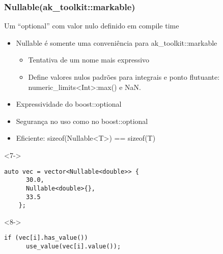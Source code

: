 \documentclass[t]{beamer}
\begin{document}
\begin{frame}[fragile]
  \frametitle{Nullable(ak\_toolkit::markable)}
  Um ``optional'' com valor nulo definido em compile time
  \begin{itemize}
    \item<1->{Nullable é somente uma conveniência para ak\_toolkit::markable}
      \begin{itemize}
      \item<2->{Tentativa de um nome mais expressivo}
      \item<3->{Define valores nulos padrões para integrais e ponto flutuante: numeric\_limits<Int>:max() e NaN.}
      \end{itemize}
    \item<4->{Expressividade do boost::optional}
    \item<5->{Segurança no uso como no boost::optional}
    \item<6->{Eficiente: sizeof(Nullable<T>) == sizeof(T)}
  \end{itemize}

  \begin{visibleenv}<7->
  \begin{lstlisting}[escapeinside=`']
    auto vec = vector<Nullable<double>> {
      30.0,
      Nullable<double>{},
      33.5
    };
  \end{lstlisting}
  \end{visibleenv}

  \begin{visibleenv}<8->
  \begin{lstlisting}[escapeinside=`']
    if (vec[i].has_value()) 
      use_value(vec[i].value());
  \end{lstlisting}
  \end{visibleenv}

\end{frame}
\end{document}
